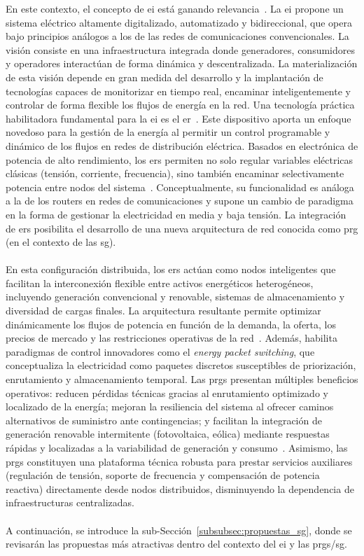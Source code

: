 En este contexto, el concepto de \gls{ei} está ganando relevancia~\cite{Xu11}. La \gls{ei} propone un sistema eléctrico altamente digitalizado, automatizado y bidireccional, que opera bajo principios análogos a los de las redes de comunicaciones convencionales. La visión consiste en una infraestructura integrada donde generadores, consumidores y operadores interactúan de forma dinámica y descentralizada. La materialización de esta visión depende en gran medida del desarrollo y la implantación de tecnologías capaces de monitorizar en tiempo real, encaminar inteligentemente y controlar de forma flexible los flujos de energía en la red. Una tecnología práctica habilitadora fundamental para la \gls{ei} es el \gls{er}~\cite{Zhou24}. Este dispositivo aporta un enfoque novedoso para la gestión de la energía al permitir un control programable y dinámico de los flujos en redes de distribución eléctrica. Basados en electrónica de potencia de alto rendimiento, los \glspl{er} permiten no solo regular variables eléctricas clásicas (tensión, corriente, frecuencia), sino también encaminar selectivamente potencia entre nodos del sistema~\cite{Zhu25}. Conceptualmente, su funcionalidad es análoga a la de los routers en redes de comunicaciones y supone un cambio de paradigma en la forma de gestionar la electricidad en media y baja tensión. La integración de \glspl{er} posibilita el desarrollo de una nueva arquitectura de red conocida como \gls{prg} (en el contexto de las \gls{sg}).\\
\\
En esta configuración distribuida, los \glspl{er} actúan como nodos inteligentes que facilitan la interconexión flexible entre activos energéticos heterogéneos, incluyendo generación convencional y renovable, sistemas de almacenamiento y diversidad de cargas finales. La arquitectura resultante permite optimizar dinámicamente los flujos de potencia en función de la demanda, la oferta, los precios de mercado y las restricciones operativas de la red~\cite{Liu18}. Además, habilita paradigmas de control innovadores como el \textit{energy packet switching}, que conceptualiza la electricidad como paquetes discretos susceptibles de priorización, enrutamiento y almacenamiento temporal. Las \glspl{prg} presentan múltiples beneficios operativos: reducen pérdidas técnicas gracias al enrutamiento optimizado y localizado de la energía; mejoran la resiliencia del sistema al ofrecer caminos alternativos de suministro ante contingencias; y facilitan la integración de generación renovable intermitente (fotovoltaica, eólica) mediante respuestas rápidas y localizadas a la variabilidad de generación y consumo~\cite{Wu2021}. Asimismo, las \glspl{prg} constituyen una plataforma técnica robusta para prestar servicios auxiliares (regulación de tensión, soporte de frecuencia y compensación de potencia reactiva) directamente desde nodos distribuidos, disminuyendo la dependencia de infraestructuras centralizadas.\\
\\
A continuación, se introduce la sub-Sección~\ref{subsubsec:propuestas_sg}, donde se revisarán las propuestas más atractivas dentro del contexto del \gls{ei} y las \glspl{prg}/\gls{sg}.

